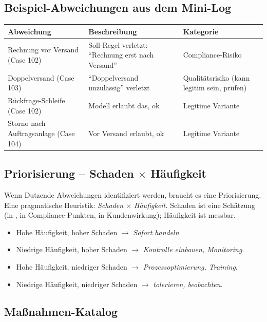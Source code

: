 \documentclass[11pt,a4paper,oneside]{article}
\begin{document}
\subsection{Beispiel-Abweichungen aus dem Mini-Log}

\begin{tabularx}{\linewidth}{@{}lXl@{}}
\toprule
\textbf{Abweichung} & \textbf{Beschreibung} & \textbf{Kategorie} \\
\midrule
Rechnung vor Versand (Case 102) & Soll-Regel verletzt: ``Rechnung erst nach Versand'' & Compliance-Risiko \\
Doppelversand (Case 103) & ``Doppelversand unzulässig'' verletzt & Qualitätsrisiko (kann legitim sein, prüfen) \\
Rückfrage-Schleife (Case 102) & Modell erlaubt das, ok & Legitime Variante \\
Storno nach Auftragsanlage (Case 104) & Vor Versand erlaubt, ok & Legitime Variante \\
\bottomrule
\end{tabularx}

\medskip

\subsection{Priorisierung -- Schaden $\times$ Häufigkeit}

Wenn Dutzende Abweichungen identifiziert werden, braucht es eine Priorisierung. Eine pragmatische Heuristik: \emph{Schaden $\times$ Häufigkeit.} Schaden ist eine Schätzung (in \text{\euro}, in Compliance-Punkten, in Kundenwirkung); Häufigkeit ist messbar.

\begin{itemize}
  \item Hohe Häufigkeit, hoher Schaden $\rightarrow$ \emph{Sofort handeln}.
  \item Niedrige Häufigkeit, hoher Schaden $\rightarrow$ \emph{Kontrolle einbauen, Monitoring}.
  \item Hohe Häufigkeit, niedriger Schaden $\rightarrow$ \emph{Prozessoptimierung, Training}.
  \item Niedrige Häufigkeit, niedriger Schaden $\rightarrow$ \emph{tolerieren, beobachten}.
\end{itemize}

\subsection{Maßnahmen-Katalog}
\end{document}
